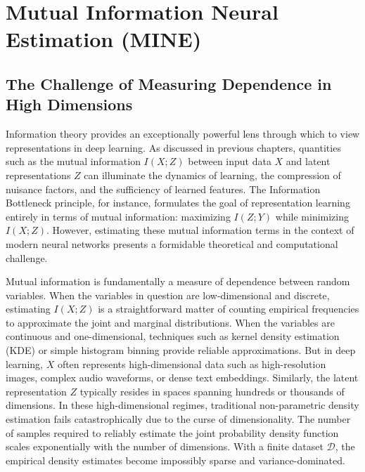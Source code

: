
\chapter{Mutual Information Neural Estimation (MINE)}
\label{ch:mine}

\section{The Challenge of Measuring Dependence in High Dimensions}

Information theory provides an exceptionally powerful lens through which to view representations in deep learning. As discussed in previous chapters, quantities such as the mutual information $I(X; Z)$ between input data $X$ and latent representations $Z$ can illuminate the dynamics of learning, the compression of nuisance factors, and the sufficiency of learned features. The Information Bottleneck principle, for instance, formulates the goal of representation learning entirely in terms of mutual information: maximizing $I(Z; Y)$ while minimizing $I(X; Z)$. However, estimating these mutual information terms in the context of modern neural networks presents a formidable theoretical and computational challenge.

Mutual information is fundamentally a measure of dependence between random variables. When the variables in question are low-dimensional and discrete, estimating $I(X; Z)$ is a straightforward matter of counting empirical frequencies to approximate the joint and marginal distributions. When the variables are continuous and one-dimensional, techniques such as kernel density estimation (KDE) or simple histogram binning provide reliable approximations. But in deep learning, $X$ often represents high-dimensional data such as high-resolution images, complex audio waveforms, or dense text embeddings. Similarly, the latent representation $Z$ typically resides in spaces spanning hundreds or thousands of dimensions. In these high-dimensional regimes, traditional non-parametric density estimation fails catastrophically due to the curse of dimensionality. The number of samples required to reliably estimate the joint probability density function scales exponentially with the number of dimensions. With a finite dataset $\mathcal{D}$, the empirical density estimates become impossibly sparse and variance-dominated.

